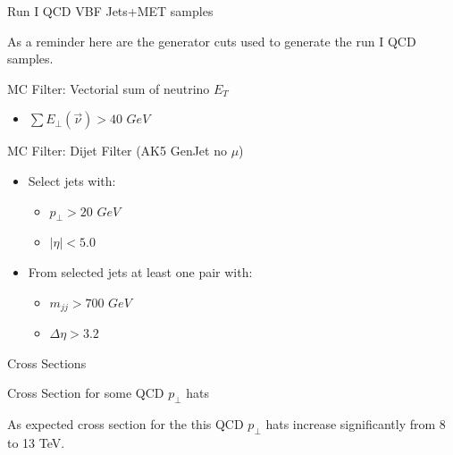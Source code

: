 \documentclass[8pt]{beamer}
\begin{document}
\begin{frame}{Run I QCD VBF Jets+MET samples}

As a reminder here are the generator cuts used to generate the run I QCD samples.

\begin{block}{MC Filter: Vectorial sum of neutrino $E_T$}

\begin{itemize}
  \item $\sum E_\perp(\vec{\nu}) > 40$ $GeV$
\end{itemize}

\end{block}

\begin{block}{MC Filter: Dijet Filter (AK5 GenJet no $\mu$)}

\begin{itemize}
  \item Select jets with:
  \begin{itemize}
    \item $p_\perp>20$ $GeV$
    \item $|\eta|<5.0$
  \end{itemize}
  \item From selected jets at least one pair with:
  \begin{itemize}
    \item $m_{jj}>700$ $GeV$
    \item $\Delta\eta>3.2$
  \end{itemize}    
\end{itemize}

\end{block}

\end{frame}

\begin{frame}{Cross Sections}

\begin{block}{Cross Section for some QCD $p_\perp$ hats}
  


\end{block}
  
As expected cross section for the this QCD $p_\perp$ hats increase significantly from 8 to 13 TeV.
  
\end{frame}
\end{document}
